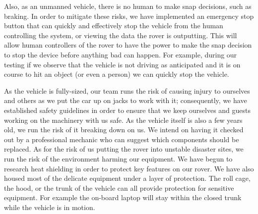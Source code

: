 Also, as an unmanned vehicle, there is no human to make snap decisions, such as braking. In order to mitigate these risks, we have implemented an emergency stop button that can quickly and effectively stop the vehicle from the human controlling the system, or viewing the data the rover is outputting. This will allow human controllers of the rover to have the power to make the snap decision to stop the device before anything bad can happen. For example, during our testing if we observe that the vehicle is not driving as anticipated and it is on course to hit an object (or even a person) we can quickly stop the vehicle.

As the vehicle is fully-sized, our team runs the risk of causing injury to ourselves and others as we put the car up on jacks to work with it; consequently, we have established safety guidelines in order to ensure that we keep ourselves and guests working on the machinery with us safe. As the vehicle itself is also a few years old, we run the risk of it breaking down on us. We intend on having it checked out by a professional mechanic who can suggest which components should be replaced. As for the risk of us putting the rover into unstable disaster sites, we run the risk of the environment harming our equipment. We have begun to research heat shielding in order to protect key features on our rover. We have also housed most of the delicate equipment under a layer of protection. The roll cage, the hood, or the trunk of the vehicle can all provide protection for sensitive equipment. For example the on-board laptop will stay within the closed trunk while the vehicle is in motion. 


